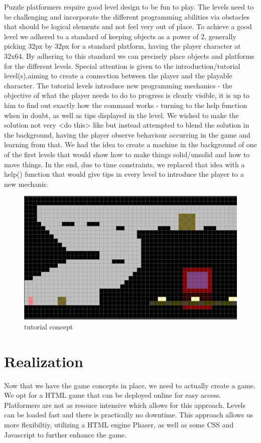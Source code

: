 \documentclass[a4paper,twoside,12pt]{article}
\begin{document}
Puzzle platformers require good level design to be fun to play. The levels need to be challenging and incorporate the different programming abilities via obstacles that should be logical elements and not feel very out of place. To achieve a good level we adhered to a standard of keeping objects as a power of 2, generally picking 32px by 32px for a standard platform, having the player character at 32x64. By adhering to this standard we can precisely place objects and platforms for the different levels.
Special attention is given to the introduction/tutorial level(s),aiming to
create a connection between the player and the playable character. The
tutorial levels introduce new programming mechanics - the objective of what
the player needs to do to progress is clearly visible, it is up to him to find
out exactly how the command works - turning to the help function when in
doubt, as well as tips displayed in the level. We wished to make the solution
not very <do this> like but instead attempted to blend the solution in the
background, having the player observe behaviour occurring in the game and
learning from that. We had the idea to create a machine in the background of
one of the first levels that would show how to make things solid/unsolid and
how to move things. In the end, due to time constraints, we replaced that idea
with a help() function that would give tips in every level to introduce the
player to a new mechanic.

\begin{figure}[H]
\includegraphics[scale=0.5]{level.png}
\caption{tutorial concept}
\end{figure}

\section{Realization}
Now that we have the game concepts in place, we need to actually create a game.
We opt for a HTML game that can be deployed online for easy access. Platformers are not as resouce intensive which allows for this approach. Levels can be loaded fast and there is practically no downtime. This approach allows us more flexibiltiy, utilizing a HTML engine Phaser, as well as some CSS and Javascript to further enhance the game.
\end{document}

